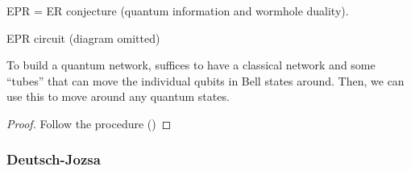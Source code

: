 \begin{remark}
	EPR = ER conjecture (quantum information and wormhole duality).
\end{remark}

EPR circuit (diagram omitted)

\begin{claim}
	To build a quantum network, suffices to have a classical network and some ``tubes'' that can move the individual qubits in Bell states around. Then, we can use this to move around any quantum states.
\end{claim}
\begin{proof}
	Follow the procedure ()

\end{proof}

\subsubsection{Deutsch-Jozsa}





